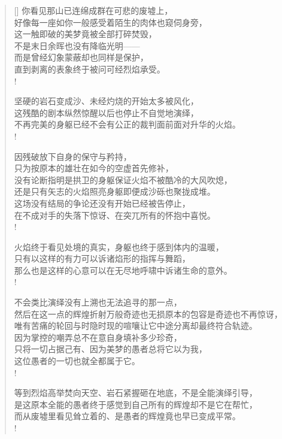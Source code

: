 \documentclass[UTF8, 12pt, a4paper]{ctexrep} %
\begin{document}
\begin{verse}[\versewidth]
你看见那山已连绵成群在可悲的废墟上，\\
好像每一座如你一般感受着陌生的肉体也窥伺身旁，\\
这一触即破的美梦竟被全部打碎焚毁，\\
不是末日余晖也没有降临光明——\\
而是曾经幻象蒙蔽却也同样是保护，\\
直到剥离的表象终于被问可经烈焰承受。\\!

坚硬的岩石变成沙、未经灼烧的开始太多被风化，\\
这残酷的剧本纵然惊醒以后也停止不自觉地演绎，\\
不再完美的身躯已经不会有公正的裁判面前面对升华的火焰。\\!

因残破放下自身的保守与矜持，\\
只为按原本的雄壮在如今的空虚首先修补，\\
没有论断指明是拱卫的身躯保证火焰不被酷冷的大风吹熄，\\
还是只有矢志的火焰照亮身躯即便成沙砾也聚拢成堆。\\
这场没有结局的争论还没有开始已经被告停止，\\
在不成对手的失落下惊讶、在突兀所有的怀抱中喜悦。\\!

火焰终于看见处境的真实，身躯也终于感到体内的温暖，\\
只有以这样的有力可以诉诸焰形的指挥与舞蹈，\\
那么也是这样的心意可以在无尽地呼啸中诉诸生命的意外。\\!

不会类比演绎没有上溯也无法追寻的那一点，\\
然后在这一点的辉煌折射万般奇迹也无损原本的包容是奇迹也不再惊讶，\\
唯有苦痛的轮回与时隐时现的喧嚷让它中途分离却最终符合轨迹。\\
因为掌控的嘲弄总不在意自身填补多少珍奇，\\
只将一切占据己有、因为美梦的愚者总将它以为我，\\
这位愚者的一切也就全都属于它。\\!

等到烈焰高举焚向天空、岩石紧握砸在地底，不是全能演绎引导，\\
是这原本全能的愚者终于感觉到自己所有的辉煌却不是它在帮忙，\\
而从废墟里看见耸立着的、是愚者的辉煌竟也早已变成平常。\\!


\end{verse}
\end{document}
